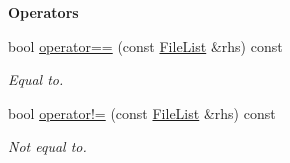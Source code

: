 \begin{Indent}{\bf Operators}
\begin{DoxyCompactItemize}
bool \hyperlink{exceptionmagrathea_1_1FileList_a6de76e018a840cf8a4198aeaef91ccff}{operator==} (const \hyperlink{exceptionmagrathea_1_1FileList}{File\-List} \&rhs) const 
\begin{DoxyCompactList}\small\item\em Equal to. \end{DoxyCompactList}\item 
bool \hyperlink{exceptionmagrathea_1_1FileList_a6a5cb99a9913d62825e9e99e2c5458dc}{operator!=} (const \hyperlink{exceptionmagrathea_1_1FileList}{File\-List} \&rhs) const 
\begin{DoxyCompactList}\small\item\em Not equal to. \end{DoxyCompactList}\end{DoxyCompactItemize}
\end{Indent}
